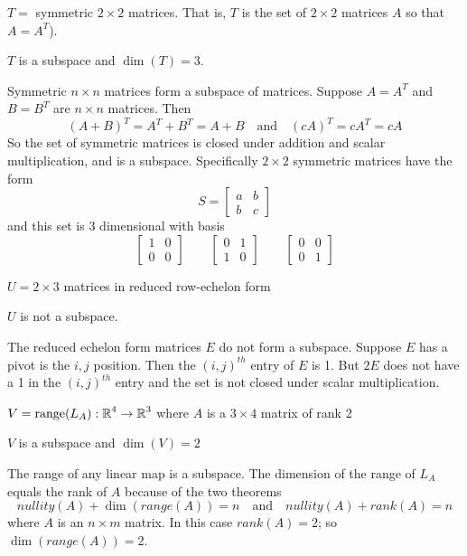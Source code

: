 \documentclass{ximera}
\begin{document}
\begin{exercise}\label{C5.2.3B}

$T = $ symmetric $2\times 2$ matrices.  That is, $T$ is the set of $2\times 2$ matrices $A$ so that $A=A^T$).

\begin{solution}

\ans $T$ is a subspace and $\dim(T) = 3$.

\soln
Symmetric $n\times n$ matrices form a subspace of matrices.  Suppose $A= A^T$ and $B = B^T$ are $n\times n$ matrices.  Then
\[
(A+B)^T = A^T + B^T = A + B  \quad\mbox{and} \quad (cA)^T = cA^T = cA
\]
So the set of symmetric matrices is closed under addition and scalar multiplication, and is a subspace. Specifically $2\times 2$ symmetric matrices have the form  
\[
S = \begin{bmatrix}
 a & b \\  b &c  
\end{bmatrix}
\]
and this set is $3$ dimensional with basis
\[
\begin{bmatrix}
 1 & 0 \\  0 &0  
\end{bmatrix} 
\qquad
\begin{bmatrix}
 0 & 1 \\  1 &0  
\end{bmatrix}
\qquad
\begin{bmatrix}
 0 & 0 \\  0 & 1  
\end{bmatrix}
\]
\end{solution}
\end{exercise}

\begin{exercise}\label{C5.2.3C}
$U = 2\times 3$ matrices in reduced row-echelon form

\begin{solution}

\ans $U$ is not a subspace.

\soln
The reduced echelon form matrices $E$ do not form a subspace.  Suppose $E$ has a pivot is the $i,j$ position.  Then the $(i,j)^{th}$ entry of $E$ is 1.  But $2E$ does not have a 1 in the $(i,j)^{th}$ entry and the set is not closed under scalar multiplication.
\end{solution}
\end{exercise}

\begin{exercise}\label{C5.2.3D}
$V = \mbox{range}(L_A):\mbox{$\Bbb{R}$}^4\to\mbox{$\Bbb{R}$}^3$ where $A$ is a $3\times 4$ matrix of rank $2$ 

\begin{solution}
\ans $V$ is a subspace and $\dim(V) = 2$

\soln
The range of any linear map is a subspace.  The dimension of the range of $L_A$ equals the rank of $A$ because of the two theorems 
\[
nullity(A) + \dim(range(A)) = n  \quad\mbox{and} \quad nullity(A) + rank(A) = n 
\]
where $A$ is an $n\times m$ matrix.  In this case $rank(A)=2$; so $\dim(range(A)) = 2$. 
\end{solution}
\end{exercise}




  
\end{document}
